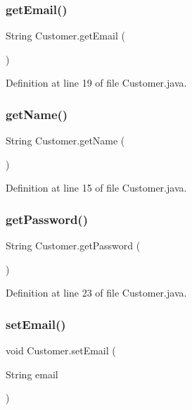 \subsubsection{\texorpdfstring{getEmail()}{getEmail()}}
{\footnotesize\ttfamily String Customer.\+get\+Email (\begin{DoxyParamCaption}{ }\end{DoxyParamCaption})}



Definition at line 19 of file Customer.\+java.

\mbox{\label{class_customer_a105aeee9f0f26ee9f96e8be6333dbde3}} 
\subsubsection{\texorpdfstring{getName()}{getName()}}
{\footnotesize\ttfamily String Customer.\+get\+Name (\begin{DoxyParamCaption}{ }\end{DoxyParamCaption})}



Definition at line 15 of file Customer.\+java.

\mbox{\label{class_customer_afcea772b0128389261e4027acb75c521}} 
\subsubsection{\texorpdfstring{getPassword()}{getPassword()}}
{\footnotesize\ttfamily String Customer.\+get\+Password (\begin{DoxyParamCaption}{ }\end{DoxyParamCaption})}



Definition at line 23 of file Customer.\+java.

\mbox{\label{class_customer_afc0161323985dd102afa764d2a030e3c}} 
\subsubsection{\texorpdfstring{setEmail()}{setEmail()}}
{\footnotesize\ttfamily void Customer.\+set\+Email (\begin{DoxyParamCaption}\item[{String}]{email }\end{DoxyParamCaption})}



